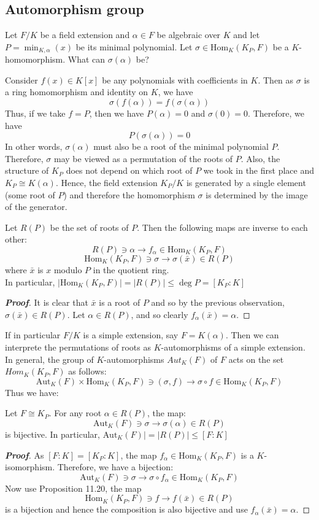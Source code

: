\subsection{Automorphism group}
Let $F/K$ be a field extension and $\alpha \in F$ be algebraic over $K$ and let $P=\min_{K,\alpha}(x)$ be its minimal polynomial. Let $\sigma \in \text{Hom}_K(K_P,F)$ be a $K$-homomorphism. What can $\sigma(\alpha)$ be?

Consider $f(x) \in K[x]$ be any polynomials with coefficients in $K$. Then as $\sigma$ is a ring homomorphism and identity on $K$, we have
$$\sigma(f(\alpha))=f(\sigma(\alpha))$$
Thus, if we take $f=P$, then we have $P(\alpha)=0$ and $\sigma(0)=0$. Therefore, we have
$$P(\sigma(\alpha))=0$$ In other words, $\sigma(\alpha)$ must also be a root of the minimal polynomial $P$.
Therefore, $\sigma$ may be viewed as a permutation of the roots of $P$.
Also, the structure of $K_P$ does not depend on which root of $P$ we took in the first place and $K_P \cong K(\alpha)$. Hence, the field extension $K_P/K$ is generated by a single element (some root of $P$) and therefore the homomorphism
$\sigma$ is determined by the image of the generator.
\begin{proposition} Let $R(P)$ be the set of roots of $P$. Then the following maps are inverse to each other:
$$R(P) \ni \alpha \rightarrow f_\alpha \in \text{Hom}_K(K_P,F)$$
$$\text{Hom}_K(K_P,F) \ni \sigma \rightarrow \sigma(\bar{x}) \in R(P)$$
where $\bar{x}$ is $x$ modulo $P$ in the quotient ring.\\
In particular, $\left|\text{Hom}_K(K_P,F)\right|=|R(P)| \le \deg{P} =[K_P:K]$
\end{proposition}
\begin{proof}[\bf Proof] It is clear that $\bar{x}$ is a root of $P$ and so by the previous observation, $\sigma(\bar{x}) \in R(P)$.
Let $\alpha \in R(P)$, and so clearly $f_\alpha(\bar{x})=\alpha$.
\end{proof}
If in particular $F/K$ is a simple extension, say $F=K(\alpha)$. Then we can interprete the permutations of roots as $K$-automorphisms of a simple extension. In
general, the group of $K$-automorphisms $Aut_K(F)$ of $F$ acts on the set $Hom_K(K_P,F)$
as follows:
$$\text{Aut}_K(F) \times \text{Hom}_K(K_P ,F) \ni (\sigma, f) \rightarrow \sigma \circ f \in \text{Hom}_K(K_P , F)$$
Thus we have:
\begin{proposition} Let $F \cong K_P$. For any root $\alpha \in R(P)$, the map:
$$\text{Aut}_K(F) \ni \sigma \rightarrow \sigma(\alpha) \in R(P)$$ is bijective. In particular,
$\text{Aut}_K(F)| =|R(P)| \le [F:K]$
\end{proposition}
\begin{proof}[\bf Proof] As $[F:K]=[K_P:K]$, the map $f_\alpha \in \text{Hom}_K(K_P,F)$ is a $K$-isomorphism. Therefore, we have a bijection:
$$\text{Aut}_K(F) \ni \sigma \rightarrow \sigma \circ f_\alpha \in \text{Hom}_K(K_P,F)$$
Now use Proposition 11.20, the map
$$\text{Hom}_K(K_P,F) \ni f \rightarrow f(\bar{x}) \in R(P)$$ is a bijection and hence the composition is also bijective
and use $f_\alpha(\bar{x})=\alpha$.
\end{proof}
